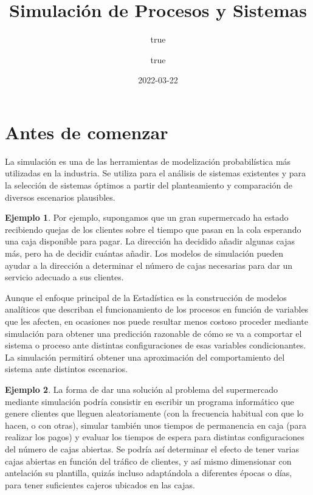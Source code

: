\documentclass[
]{book}
\title{Simulación de Procesos y Sistemas}
\author{true \and true}
\date{2022-03-22}
\newenvironment{whitebox}{
  \definecolor{shadecolor}{rgb}{255, 255, 255}  
  \color{black}
  \begin{shaded}}
 {\end{shaded}}
\theoremstyle{definition}
\theoremstyle{definition}
\newtheorem{example}{Ejemplo}[chapter]
\theoremstyle{definition}
\theoremstyle{definition}
\theoremstyle{remark}
\begin{document}
\maketitle

{
\setcounter{tocdepth}{1}
\tableofcontents
}
\hypertarget{antes-de-comenzar}{%
\chapter*{Antes de comenzar}\label{antes-de-comenzar}}

La simulación es una de las herramientas de modelización probabilística más utilizadas en la industria. Se utiliza para el análisis de sistemas existentes y para la selección de sistemas óptimos a partir del planteamiento y comparación de diversos escenarios plausibles.

\begin{whitebox}

\begin{example}
Por ejemplo, supongamos que un gran supermercado ha estado recibiendo quejas de los clientes sobre el tiempo que pasan en la cola esperando una caja disponible para pagar. La dirección ha decidido añadir algunas cajas más, pero ha de decidir cuántas añadir. Los modelos de simulación pueden ayudar a la dirección a determinar el número de cajas necesarias para dar un servicio adecuado a sus clientes.
\end{example}

\end{whitebox}

Aunque el enfoque principal de la Estadística es la construcción de modelos analíticos que describan el funcionamiento de los procesos en función de variables que les afecten, en ocasiones nos puede resultar menos costoso proceder mediante simulación para obtener una predicción razonable de cómo se va a comportar el sistema o proceso ante distintas configuraciones de esas variables condicionantes. La simulación permitirá obtener una aproximación del comportamiento del sistema ante distintos escenarios.

\begin{whitebox}

\begin{example}
La forma de dar una solución al problema del supermercado mediante simulación podría consistir en escribir un programa informático que genere clientes que lleguen aleatoriamente (con la frecuencia habitual con que lo hacen, o con otras), simular también unos tiempos de permanencia en caja (para realizar los pagos) y evaluar los tiempos de espera para distintas configuraciones del número de cajas abiertas. Se podría así determinar el efecto de tener varias cajas abiertas en función del tráfico de clientes, y así mismo dimensionar con antelación su plantilla, quizás incluso adaptándola a diferentes épocas o días, para tener suficientes cajeros ubicados en las cajas.
\end{example}

\end{whitebox}
\end{document}
